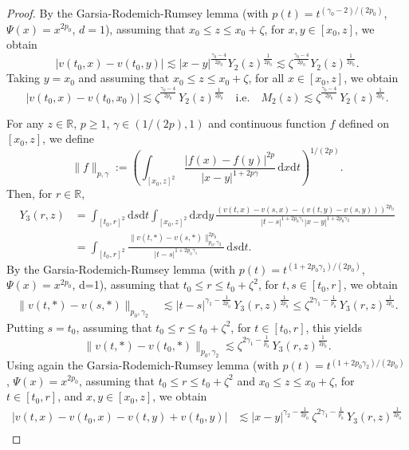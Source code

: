 \documentclass[12pt,a4paper]{article}
\newcommand{\R}{{\mathbb{R}}}
\renewcommand{\d}{\mathrm{d}}
\newcommand {\deltah}{{\zeta}}
\newcommand{\<}{\langle}
\renewcommand{\>}{\rangle}
\begin{document}
\begin{proof}
By the Garsia-Rodemich-Rumsey lemma \cite[Lemma A.3.1]{nualart2006} (with $p(t) = t^{(\gamma_0 - 2)/(2 p_0)}$, $\Psi(x) = x^{2 p_0}$, $d=1$),  assuming that $x_0\le z\le x_0+\deltah$, for $x,y\in [x_0,z]$, we obtain
\[
|v(t_0,x)-v(t_0,y)| \lesssim |x-y|^{\frac {\gamma_0-4}{2p_0}}  Y_2(z) ^{\frac 1{2p_0}} \lesssim\deltah^{\frac {\gamma_0-4}{2p_0}} 
Y_2(z) ^{\frac 1{2p_0}}.
\]
Taking $y=x_0$ and assuming that $x_0 \leq z \le x_0+\deltah$,  for all $x\in [x_0,z]$, we obtain
   \begin{equation} \label{EQ1}
|v(t_0,x)-v(t_0,x_0)| \lesssim \deltah^{\frac {\gamma_0-4}{2p_0}} \, Y_2(z) ^{\frac 1{2p_0}}\quad\text{i.e.}\quad M_2(z) \lesssim \deltah^{\frac {\gamma_0-4}{2p_0}} \, Y_2(z) ^{\frac 1{2p_0}}.
\end{equation}

 For any $z \in \R$, $p \geq 1$, $\gamma\in \left(1/(2p),1\right)$ and continuous function $f$ defined on $[x_0,z]$, we define
 \[
     \|f\|_{p,\gamma}:=\left( \int_{[x_0,z]^2} \frac{|f(x)-f(y)|^{2p}}{|x-y|^{1+2p\gamma}}\, \d x\d t \right)^{1/(2p)}.
 \]
 Then, for $r\in \R$,
 \begin{align*}
 Y_3(r,z)&=\int_{[t_0,r]^2}\d s\d t \int_{[x_0,z]^2} \d x\d y\, \frac {(v(t,x)-v(s,x) - (v(t,y) - v(s,y)))^{2p_0}}{|t-s|^{1+2p_0\gamma_1}|x-y|^{1+2p_0\gamma_2}}\\
 &=\int_{[t_0,r]^2} \frac { \| v(t,*) - v(s,*) \|^{2p_0}_{p_0,\gamma_2}}
 {|t-s|^{1+2p_0\gamma_1}}\, \d s\d t.
 \end{align*}
By the Garsia-Rodemich-Rumsey lemma \cite[Lemma A.3.1]{nualart2006} (with $p(t) = t^{(1 + 2 p_0 \gamma_1)/(2 p_0)}$, $\Psi(x) = x^{2 p_0}$, d=1), assuming that  $t_0\le r\le t_0+\deltah^2$, for $t,s\in [t_0,r]$, we obtain
 \begin{align*}
 \|v(t,*)-v(s,*)\|_{p_0,\gamma_2}& \lesssim |t-s|^{\gamma_1-\frac 1{2p_0}} \,
 Y_3(r,z)^{\frac 1{2p_0}}\le  \deltah^{2\gamma_1-\frac 1{p_0}}\, Y_3(r,z)^{\frac 1{2p_0}}.
 \end{align*}
 Putting $s=t_0$,  assuming that   $t_0\le r\le t_0+\deltah^2$, for $t\in [t_0,r]$,  this yields
  \[
 \|v(t,*)-v(t_0,*)\|_{p_0,\gamma_2} \lesssim  \deltah^{2\gamma_1-\frac 1{p_0}}\, Y_3(r,z)^{\frac 1{2p_0}}.
 \]
 Using again the Garsia-Rodemich-Rumsey lemma \cite[Lemma A.3.1]{nualart2006} (with $p(t) = t^{(1 + 2 p_0 \gamma_2)/(2 p_0)}$, $\Psi(x) = x^{2 p_0}$, assuming that  $t_0\le r\le t_0+\deltah^2$ and $x_0\le z\le x_0+\deltah$, for $t\in [t_0,r]$,  
 and $x,y \in [x_0,z]$,  we obtain
  \begin{align*}
 |v(t,x)-v(t_0,x)-v(t,y)+v(t_0,y)| &\lesssim  |x-y|^{\gamma_2-\frac1{2p_0}} \, \deltah^{2\gamma_1-\frac 1{p_0}}\,  Y_3(r,z)^{\frac 1{2p_0}} \\

\end{align*}
\end{proof}
\end{document}
